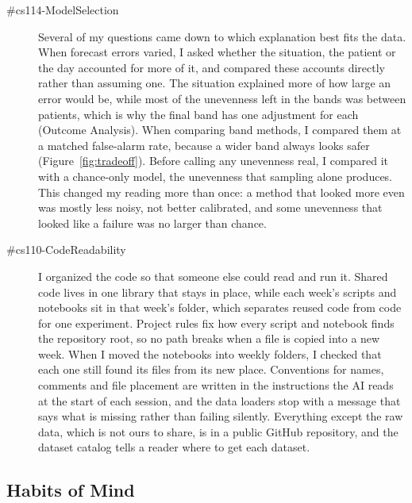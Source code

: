 \begin{description}
\item[\#cs114-ModelSelection] Several of my questions came down to which explanation best fits the data. When forecast errors varied, I asked whether the situation, the patient or the day accounted for more of it, and compared these accounts directly rather than assuming one. The situation explained more of how large an error would be, while most of the unevenness left in the bands was between patients, which is why the final band has one adjustment for each (Outcome Analysis). When comparing band methods, I compared them at a matched false-alarm rate, because a wider band always looks safer (Figure~\ref{fig:tradeoff}). Before calling any unevenness real, I compared it with a chance-only model, the unevenness that sampling alone produces. This changed my reading more than once: a method that looked more even was mostly less noisy, not better calibrated, and some unevenness that looked like a failure was no larger than chance.

\item[\#cs110-CodeReadability] I organized the code so that someone else could read and run it. Shared code lives in one library that stays in place, while each week's scripts and notebooks sit in that week's folder, which separates reused code from code for one experiment. Project rules fix how every script and notebook finds the repository root, so no path breaks when a file is copied into a new week. When I moved the notebooks into weekly folders, I checked that each one still found its files from its new place. Conventions for names, comments and file placement are written in the instructions the AI reads at the start of each session, and the data loaders stop with a message that says what is missing rather than failing silently. Everything except the raw data, which is not ours to share, is in a public GitHub repository, and the dataset catalog tells a reader where to get each dataset.
\end{description}

\subsection{Habits of Mind}


